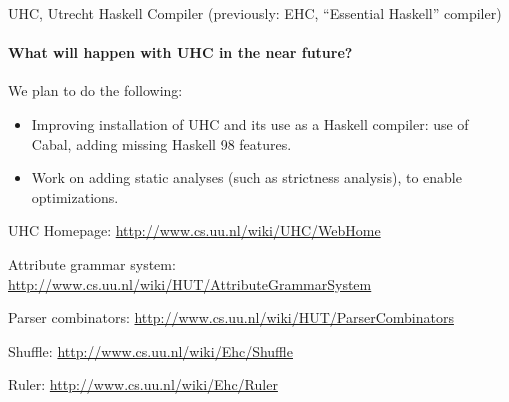 \begin{hcarentry}{UHC, Utrecht Haskell Compiler (previously: EHC, ``Essential Haskell'' compiler)}
\paragraph{What will happen with UHC in the near future?}
We plan to do the following:

\begin{itemize}
\item
  Improving installation of UHC and its use as a Haskell compiler: use of Cabal, adding missing Haskell 98 features.
\item
  Work on adding static analyses (such as strictness analysis), to enable optimizations.
\end{itemize}

\FurtherReading
\begin{compactitem}
\item UHC Homepage:
\url{http://www.cs.uu.nl/wiki/UHC/WebHome}

\item Attribute grammar system:
\url{http://www.cs.uu.nl/wiki/HUT/AttributeGrammarSystem}

\item Parser combinators:
\url{http://www.cs.uu.nl/wiki/HUT/ParserCombinators}

\item Shuffle:
\url{http://www.cs.uu.nl/wiki/Ehc/Shuffle}

\item Ruler:
\url{http://www.cs.uu.nl/wiki/Ehc/Ruler}
\end{compactitem}
\end{hcarentry}
